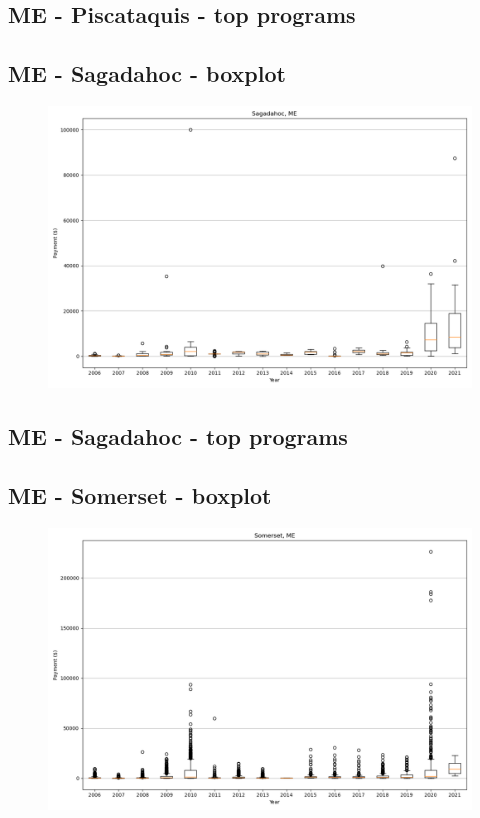 \subsection*{ME - Piscataquis - top programs}

\newpage
\subsection*{ME - Sagadahoc - boxplot}
\begin{figure}[h]
\centering
\includegraphics[width=7in]{../output/boxplots/counties/Sagadahoc-ME_boxplot.png}
\end{figure}


\subsection*{ME - Sagadahoc - top programs}

\newpage
\subsection*{ME - Somerset - boxplot}
\begin{figure}[h]
\centering
\includegraphics[width=7in]{../output/boxplots/counties/Somerset-ME_boxplot.png}
\end{figure}


